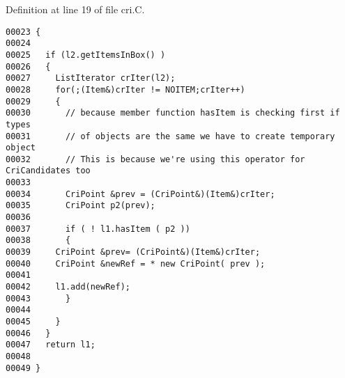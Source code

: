 Definition at line 19 of file cri.C.\small\begin{verbatim}00023 {
00024   
00025   if (l2.getItemsInBox() )
00026   {
00027     ListIterator crIter(l2);
00028     for(;(Item&)crIter != NOITEM;crIter++)
00029     {
00030       // because member function hasItem is checking first if types
00031       // of objects are the same we have to create temporary object
00032       // This is because we're using this operator for CriCandidates too
00033 
00034       CriPoint &prev = (CriPoint&)(Item&)crIter;
00035       CriPoint p2(prev);
00036 
00037       if ( ! l1.hasItem ( p2 ))
00038       {
00039     CriPoint &prev= (CriPoint&)(Item&)crIter;
00040     CriPoint &newRef = * new CriPoint( prev );
00041 
00042     l1.add(newRef);      
00043       }
00044 
00045     }
00046   }
00047   return l1;
00048   
00049 }
\end{verbatim}\normalsize 
